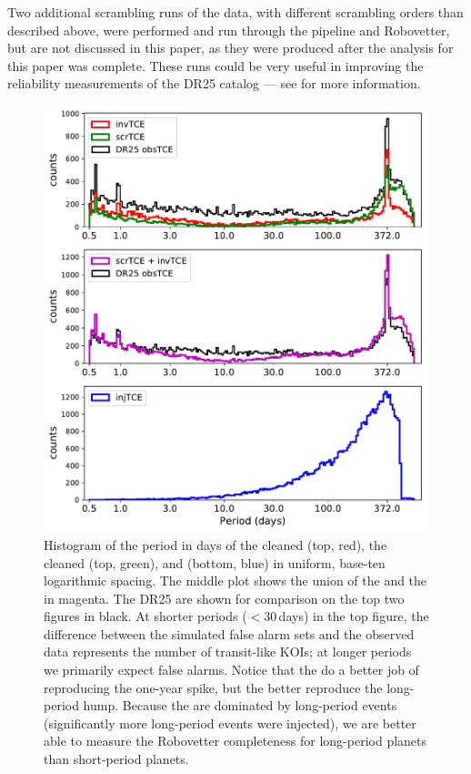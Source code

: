 Two additional scrambling runs of the data, with different scrambling orders than described above, were performed and run through the \Kepler{} pipeline and Robovetter, but are not discussed in this paper, as they were produced after the analysis for this paper was complete. These runs could be very useful in improving the reliability measurements of the DR25 catalog --- see \citealt{Coughlin2017a} for more information.


\begin{figure}[hp]
 \begin{center}
  \includegraphics[width=0.975\linewidth]{f2.pdf}
  \caption{Histogram of the period in days of the cleaned  (top, red), the cleaned  (top, green), and  (bottom, blue) in uniform, base-ten logarithmic spacing. The middle plot shows the union of the \invtces{} and the \scrtces{} in magenta.  The DR25  are shown for comparison on the top two figures in black.  At shorter periods ($< 30$\,days) in the top figure, the difference between the simulated false alarm sets and the observed data represents the number of transit-like KOIs; at longer periods we primarily expect false alarms. Notice that the  do a better job of reproducing the one-year spike, but the  better reproduce the long-period hump. Because the  are dominated by long-period events (significantly more long-period events were injected), we are better able to measure the Robovetter completeness for long-period planets than short-period planets.}
  \label{f:simtces} 
 \end{center}
 \end{figure}


